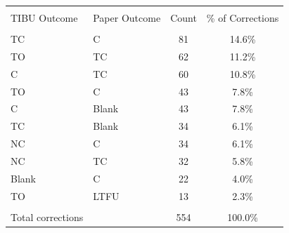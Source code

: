 \scriptsize{
\begin{tabular}{llcc}
\hline\hline \\[-8pt]
\rowcolor{yellow!15} TIBU Outcome & Paper Outcome & Count & \% of Corrections \\
\hline \\[-8pt]
TC & C & 81 & 14.6\% \\
TO & TC & 62 & 11.2\% \\
C & TC & 60 & 10.8\% \\
TO & C & 43 & 7.8\% \\
C & Blank & 43 & 7.8\% \\
TC & Blank & 34 & 6.1\% \\
NC & C & 34 & 6.1\% \\
NC & TC & 32 & 5.8\% \\
Blank & C & 22 & 4.0\% \\
TO & LTFU & 13 & 2.3\% \\
\hline \\[-8pt]
Total corrections & & 554 & 100.0\% \\
\hline\hline
\end{tabular}}